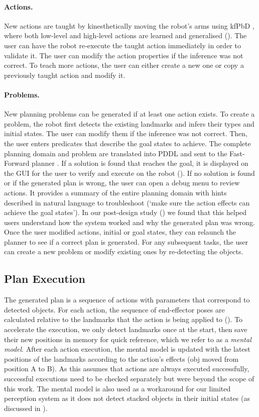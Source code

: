 \paragraph{Actions.} New actions are taught by kinesthetically moving the robot's arms using kfPbD \cite{akgun2012keyframe}, where both low-level and high-level actions are learned and generalised ().
The user can have the robot re-execute the taught action immediately in order to validate it.
The user can modify the action properties if the inference was not correct.
To teach more actions, the user can either create a new one or copy a previously taught action and modify it.

\paragraph{Problems.} New planning problems can be generated if at least one action exists.
To create a problem, the robot first detects the existing landmarks and infers their types and initial states.
The user can modify them if the inference was not correct.
Then, the user enters predicates that describe the goal states to achieve.
The complete planning domain and problem are translated into PDDL and sent to the Fast-Forward planner \cite{hoffmann2001ff}.
If a solution is found that reaches the goal, it is displayed on the GUI for the user to verify and execute on the robot ().
If no solution is found or if the generated plan is wrong, the user can open a debug menu to review actions.
It provides a summary of the entire planning domain with hints described in natural language to troubleshoot (\eg `make sure the action effects can achieve the goal states').
In our post-design study () we found that this helped users understand how the system worked and why the generated plan was wrong.
Once the user modified actions, initial or goal states, they can relaunch the planner to see if a correct plan is generated.
For any subsequent tasks, the user can create a new problem or modify existing ones by re-detecting the objects.

\subsection{Plan Execution} 
The generated plan is a sequence of actions with parameters that correspond to detected objects.
For each action, the sequence of end-effector poses are calculated relative to the landmarks that the action is being applied to ().
To accelerate the execution, we only detect landmarks once at the start, then save their new positions in memory for quick reference, which we refer to as a \textit{mental model}.
After each action execution, the mental model is updated with the latest positions of the landmarks according to the action's effects (\eg obj moved from position A to B).
As this assumes that actions are always executed successfully, successful executions need to be checked separately but were beyond the scope of this work.
The mental model is also used as a workaround for our limited perception system as it does not detect stacked objects in their initial states (as discussed in ).


